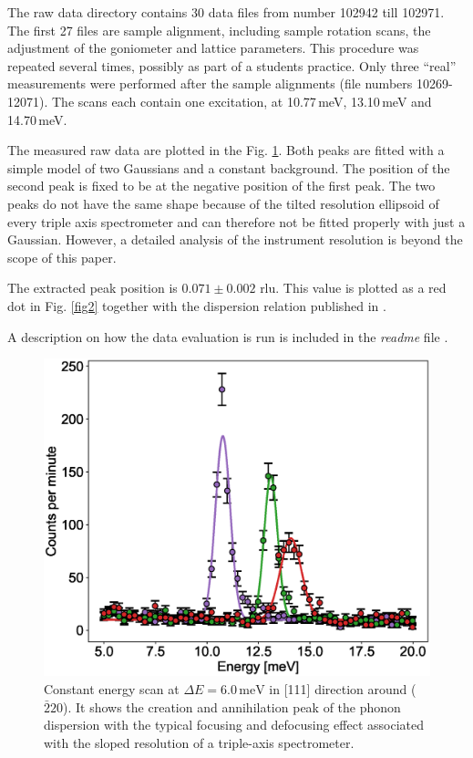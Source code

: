 \documentclass[aps,pra,reprint,amsmath,amssymb,superscriptaddress,showkeys]{revtex4-1}
\begin{document}
The raw data directory contains 30 data files from number 102942 till 102971. 
The first 27 files are sample alignment, including sample rotation scans, the adjustment of the goniometer and lattice parameters. 
This procedure was repeated several times, possibly as part of a students practice.
Only three ``real'' measurements were performed after the sample alignments (file numbers 10269-12071).
The scans each contain one excitation, at 10.77\,meV, 13.10\,meV and 14.70\,meV. 

The measured raw data are plotted in the Fig. \ref{fig1}.
Both peaks are fitted with a simple model of two Gaussians and a constant background. 
The position of the second peak is fixed to be at the negative position of the first peak. 
The two peaks do not have the same shape because of the tilted resolution ellipsoid of every triple axis spectrometer and can therefore not be fitted properly with just a Gaussian. 
However, a detailed analysis of the instrument resolution is beyond the scope of this paper.

The extracted peak position is $0.071 \pm  0.002$ rlu. 
This value is plotted as a red dot in Fig. \ref{fig2} together with the dispersion relation published in \cite{Aouissi}.

A description on how the data evaluation is run is included in the \emph{readme} file \cite{data-evaluation}.


\begin{figure}
    \includegraphics[width=1.0\linewidth]{energy-scan.eps}
    \caption{\label{fig1} Constant energy scan at $\Delta E = 6.0\,\mathrm{meV}$ in [111] direction around ($\bar{2}20$). It shows the creation and annihilation peak of the phonon dispersion with the typical focusing and defocusing effect associated with the sloped resolution of a triple-axis spectrometer.}
\end{figure}
\end{document}

